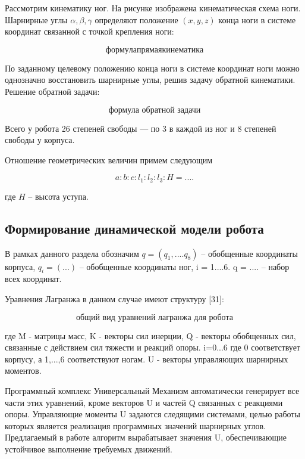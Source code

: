 Рассмотрим кинематику ног. На рисунке  изображена кинематическая схема ноги. Шарнирные углы $\alpha,\beta,\gamma$ определяют положение $(x,y,z)$ конца ноги в системе координат связанной с точкой крепления ноги:

\begin{equation}
{формула прямая кинематика}
\end{equation}

По заданному целевому положению конца ноги в системе координат ноги можно однозначно восстановить шарнирные углы, решив задачу обратной кинематики. Решение обратной задачи:

\begin{equation}
  \text{формула обратной задачи}  
\end{equation}

Всего у робота 26 степеней свободы --- по 3 в каждой из ног и 8 степеней свободы у корпуса.

Отношение геометрических величин примем следующим

\begin{equation}
\label{articulated:ratio}
  a:b:c:l_1:l_2:l_3:H = ....
\end{equation}

где $H$ -- высота уступа.

\subsection{Формирование динамической модели робота}
В рамках данного раздела обозначим $q = (q_1, ....q_8)$ -- обобщенные координаты корпуса, $q_i = (...)$ -- обобщенные координаты ног, i = 1....6. q = .... -- набор всех координат.

Уравнения Лагранжа в данном случае имеют структуру [31]:

\begin{equation}
\text{общий вид уравнений лагранжа для робота}
\end{equation}

где M - матрицы масс, K - векторы сил инерции, Q  - векторы обобщенных сил, связанные с действием сил тяжести и реакций опоры. i=0...6 где 0 соответствует корпусу, а 1,...,6 соответствуют ногам. U - векторы управляющих шарнирных моментов.

Программный комплекс Универсальный Механизм автоматически генерирует все части этих уравнений, кроме векторов U и  частей Q связанных с реакциями опоры. Управляющие моменты U задаются следящими системами, целью работы которых является реализация программных значений шарнирных углов. Предлагаемый в работе алгоритм вырабатывает значения U, обеспечивающие устойчивое выполнение требуемых движений.



